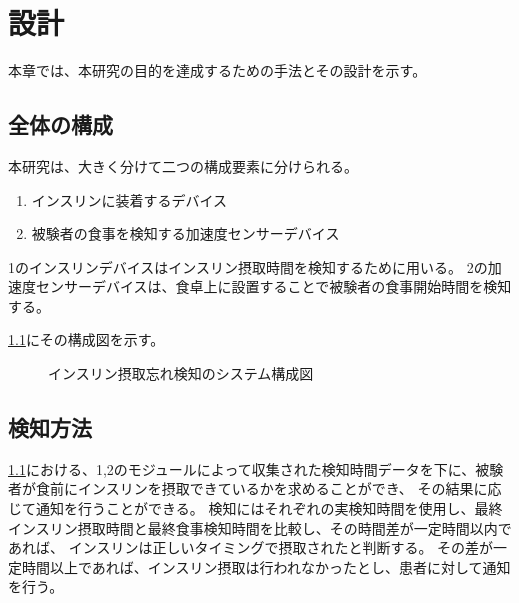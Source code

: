 \chapter{設計}
\label{chap:design}

本章では、本研究の目的を達成するための手法とその設計を示す。

\section{全体の構成}
本研究は、大きく分けて二つの構成要素に分けられる。

\begin{enumerate}
  \item インスリンに装着するデバイス
  \item 被験者の食事を検知する加速度センサーデバイス
\end{enumerate}

1のインスリンデバイスはインスリン摂取時間を検知するために用いる。
2の加速度センサーデバイスは、食卓上に設置することで被験者の食事開始時間を検知する。

\ref{fig:insulin_design}にその構成図を示す。

\begin{figure}
  \caption{インスリン摂取忘れ検知のシステム構成図}
  \label{fig:insulin_design}
  \begin{center}
  \end{center}
\end{figure}

\section{検知方法}

\ref{fig:insulin_design}における、1,2のモジュールによって収集された検知時間データを下に、被験者が食前にインスリンを摂取できているかを求めることができ、
その結果に応じて通知を行うことができる。
検知にはそれぞれの実検知時間を使用し、最終インスリン摂取時間と最終食事検知時間を比較し、その時間差が一定時間以内であれば、
インスリンは正しいタイミングで摂取されたと判断する。
その差が一定時間以上であれば、インスリン摂取は行われなかったとし、患者に対して通知を行う。


